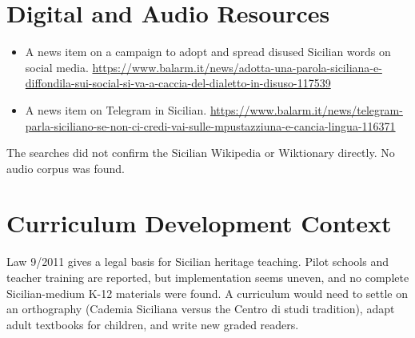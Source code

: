 \documentclass[12pt]{article}
\begin{document}
\section{Digital and Audio Resources}
\begin{itemize}
\item A news item on a campaign to adopt and spread disused Sicilian words on social media. \url{https://www.balarm.it/news/adotta-una-parola-siciliana-e-diffondila-sui-social-si-va-a-caccia-del-dialetto-in-disuso-117539}
\item A news item on Telegram in Sicilian. \url{https://www.balarm.it/news/telegram-parla-siciliano-se-non-ci-credi-vai-sulle-mpustazziuna-e-cancia-lingua-116371}
\end{itemize}
The searches did not confirm the Sicilian Wikipedia or Wiktionary directly. No audio corpus was found.

\section{Curriculum Development Context}
Law 9/2011 gives a legal basis for Sicilian heritage teaching. Pilot schools and teacher training are reported, but implementation seems uneven, and no complete Sicilian-medium K-12 materials were found. A curriculum would need to settle on an orthography (Cademia Siciliana versus the Centro di studi tradition), adapt adult textbooks for children, and write new graded readers.
\end{document}
